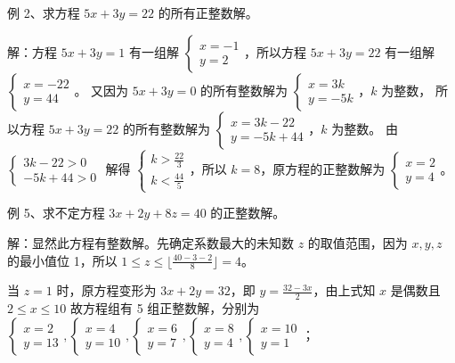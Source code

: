 \vspace{0.5pt}
\nopagecolor
\begin{questions}
    \question 例 2、求方程 $5x + 3y = 22$ 的所有正整数解。

\begin{solution}
解：方程 $5x + 3y = 1$ 有一组解 $\begin{cases} x = -1 \\ y = 2 \end{cases}$，所以方程 $5x + 3y = 22$ 有一组解 $\begin{cases} x = -22 \\ y = 44 \end{cases}$。
又因为 $5x + 3y = 0$ 的所有整数解为 $\begin{cases} x = 3k \\ y = -5k \end{cases}$，$k$ 为整数，
所以方程 $5x + 3y = 22$ 的所有整数解为 $\begin{cases} x = 3k - 22 \\ y = -5k + 44 \end{cases}$，$k$ 为整数。
由 $\begin{cases} 3k - 22 > 0 \\ -5k + 44 > 0 \end{cases}$ 解得 $\begin{cases} k > \frac{22}{3} \\ k < \frac{44}{5} \end{cases}$，所以 $k = 8$，原方程的正整数解为 $\begin{cases} x = 2 \\ y = 4 \end{cases}$。
\end{solution}

\question 例 5、求不定方程 $3x + 2y + 8z = 40$ 的正整数解。

\begin{solution}
解：显然此方程有整数解。先确定系数最大的未知数 $z$ 的取值范围，因为 $x, y, z$ 的最小值位 1，所以 $1 \le z \le \lfloor \frac{40 - 3 - 2}{8} \rfloor = 4$。

当 $z = 1$ 时，原方程变形为 $3x + 2y = 32$，即 $y = \frac{32 - 3x}{2}$，由上式知 $x$ 是偶数且 $2 \le x \le 10$ 故方程组有 5 组正整数解，分别为 $\begin{cases} x = 2 \\ y = 13 \end{cases}, \begin{cases} x = 4 \\ y = 10 \end{cases}, \begin{cases} x = 6 \\ y = 7 \end{cases}, \begin{cases} x = 8 \\ y = 4 \end{cases}, \begin{cases} x = 10 \\ y = 1 \end{cases}$；


\end{solution}
\end{questions}
